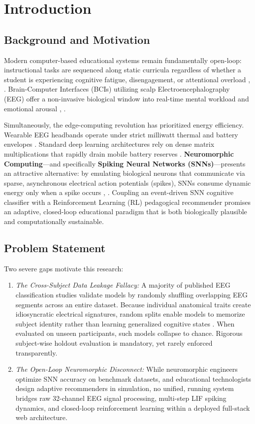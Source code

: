 \documentclass[conference]{IEEEtran}
\begin{document}
\section{Introduction}

\subsection{Background and Motivation}
Modern computer-based educational systems remain fundamentally open-loop: instructional tasks are sequenced along static curricula regardless of whether a student is experiencing cognitive fatigue, disengagement, or attentional overload \cite{r1}, \cite{r2}. Brain-Computer Interfaces (BCIs) utilizing scalp Electroencephalography (EEG) offer a non-invasive biological window into real-time mental workload and emotional arousal \cite{r3}, \cite{r4}. 

Simultaneously, the edge-computing revolution has prioritized energy efficiency. Wearable EEG headbands operate under strict milliwatt thermal and battery envelopes \cite{r5}. Standard deep learning architectures rely on dense matrix multiplications that rapidly drain mobile battery reserves \cite{r6}. \textbf{Neuromorphic Computing}---and specifically \textbf{Spiking Neural Networks (SNNs)}---presents an attractive alternative: by emulating biological neurons that communicate via sparse, asynchronous electrical action potentials (spikes), SNNs consume dynamic energy only when a spike occurs \cite{r7}, \cite{r8}. Coupling an event-driven SNN cognitive classifier with a Reinforcement Learning (RL) pedagogical recommender promises an adaptive, closed-loop educational paradigm that is both biologically plausible and computationally sustainable.

\subsection{Problem Statement}
Two severe gaps motivate this research:
\begin{enumerate}
    \item \textit{The Cross-Subject Data Leakage Fallacy:} A majority of published EEG classification studies validate models by randomly shuffling overlapping EEG segments across an entire dataset. Because individual anatomical traits create idiosyncratic electrical signatures, random splits enable models to memorize subject identity rather than learning generalized cognitive states \cite{r9}. When evaluated on unseen participants, such models collapse to chance. Rigorous subject-wise holdout evaluation is mandatory, yet rarely enforced transparently.
    \item \textit{The Open-Loop Neuromorphic Disconnect:} While neuromorphic engineers optimize SNN accuracy on benchmark datasets, and educational technologists design adaptive recommenders in simulation, no unified, running system bridges raw 32-channel EEG signal processing, multi-step LIF spiking dynamics, and closed-loop reinforcement learning within a deployed full-stack web architecture.
\end{enumerate}
\end{document}
